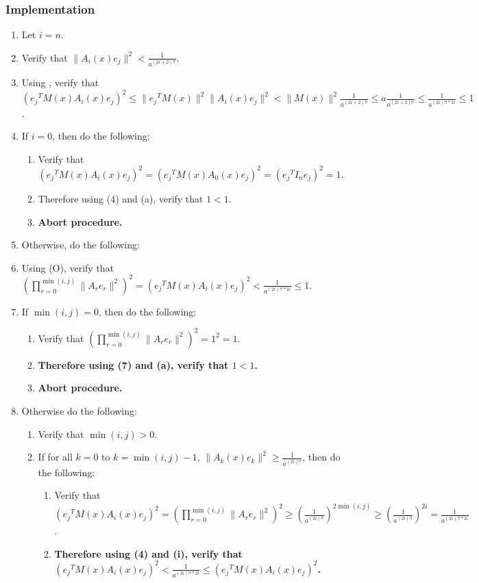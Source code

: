 \documentclass[twocolumn]{article}
\newcommand{\implementation}{\subsubsection*{Implementation}}
\newcommand{\procedurehr}[2][]{\hyperref[sec:procedure #2]{\ifthenelse{\equal{#1}{}}{procedure #2}{#1}}}
\begin{document}
			\implementation
				\begin{enumerate}
					\item Let $i=n$.
					\item Verify that $\lVert A_i(x)e_j\rVert^2<\frac{1}{a^{(2i+2)!!}}$.
					\item Using \procedurehr{3.77}, verify that $({e_j}^TM(x)A_i(x)e_j)^2\le\lVert{e_j}^TM(x)\rVert^2\lVert A_i(x)e_j\rVert^2<\lVert M(x)\rVert^2\frac{1}{a^{(2i+2)!!}}\le a\frac{1}{a^{(2i+2)!!}}\le\frac{1}{a^{(2i)!!*2i}}\le 1$.
					\item If $i=0$, then do the following:
					\begin{enumerate}
						\item Verify that $({e_j}^TM(x)A_i(x)e_j)^2=({e_j}^TM(x)A_0(x)e_j)^2=({e_j}^TI_ne_j)^2=1$.
						\item Therefore using (4) and (a), verify that $1<1$.
						\item \textbf{Abort procedure.}
					\end{enumerate}
					\item Otherwise, do the following:
					\item Using (O), verify that $(\prod_{r=0}^{\min(i,j)}\lVert A_re_r\rVert^2)^2=({e_j}^TM(x)A_i(x)e_j)^2<\frac{1}{a^{(2i)!!*2i}}\le 1$.
					\item If $\min(i,j)=0$, then do the following:
					\begin{enumerate}
						\item Verify that $(\prod_{r=0}^{\min(i,j)}\lVert A_re_r\rVert^2)^2=1^2=1$.
						\item \textbf{Therefore using (7) and (a), verify that $1<1$.}
						\item \textbf{Abort procedure.}
					\end{enumerate}
					\item Otherwise do the following:
					\begin{enumerate}
						\item Verify that $\min(i,j)>0$.
						\item If for all $k=0$ to $k=\min(i,j)-1$, $\lVert A_k(x)e_{k}\rVert^2\ge\frac{1}{a^{(2i)!!}}$, then do the following:
						\begin{enumerate}
							\item Verify that $({e_j}^TM(x)A_i(x)e_j)^2=(\prod_{r=0}^{\min(i,j)}\lVert A_re_r\rVert^2)^2\ge(\frac{1}{a^{(2i)!!}})^{2\min(i,j)}\ge(\frac{1}{a^{(2i)!!}})^{2i}=\frac{1}{a^{(2i)!!*2i}}$.
							\item \textbf{Therefore using (4) and (i), verify that $({e_j}^TM(x)A_i(x)e_j)^2<\frac{1}{a^{(2i)!!*2i}}\le ({e_j}^TM(x)A_i(x)e_j)^2$.}

\end{enumerate}
\end{enumerate}
\end{enumerate}
\end{document}
